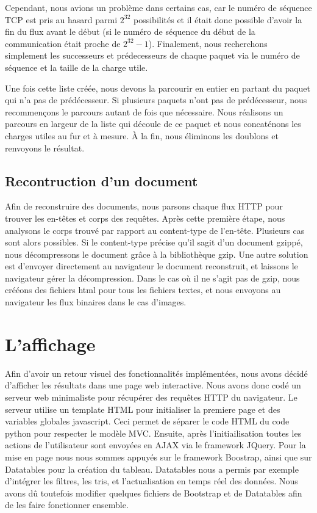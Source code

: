 Cependant, nous avions un problème dans certains cas, car le numéro de séquence TCP est pris au hasard parmi $2^{32}$ possibilités et il était donc possible d'avoir la fin du flux 
avant le début (si le numéro de séquence du début de la communication était proche de $2^{32} -1$). Finalement, nous recherchons simplement les successeurs et prédecesseurs de chaque
paquet via le numéro de séquence et la taille de la charge utile.

Une fois cette liste créée, nous devons la parcourir en entier en partant du paquet qui n'a pas de prédécesseur. Si plusieurs paquets n'ont pas de prédécesseur, nous recommençons le parcours autant de fois que nécessaire. Nous réalisons un parcours en largeur de la liste qui découle de ce paquet et nous concaténons les charges utiles au fur et à mesure. À la fin, nous éliminons les doublons et renvoyons le résultat.


\subsection{Recontruction d'un document}

Afin de reconstruire des documents, nous parsons chaque flux HTTP pour trouver les en-têtes et corps des requêtes. Après cette première étape, nous analysons le corps trouvé par rapport au content-type de l'en-tête.
Plusieurs cas sont alors possibles. Si le content-type précise qu'il sagit d'un document gzippé, nous décompressons le document grâce à la bibliothèque gzip. Une autre solution est d'envoyer directement au navigateur le document reconstruit, et laissons le navigateur gérer la décompression.
Dans le cas où il ne s'agit pas de gzip, nous crééons des fichiers html pour tous les fichiers textes, et nous envoyons au navigateur les flux binaires dans le cas d'images.



\section{L'affichage}
Afin d'avoir un retour visuel des fonctionnalités implémentées, nous avons décidé d'afficher les résultats dans une page web interactive. 
Nous avons donc codé un serveur web minimaliste pour récupérer des requêtes HTTP du navigateur. Le serveur utilise un template HTML pour
initialiser la premiere page et des variables globales javascript. Ceci permet de séparer le code HTML du code python pour respecter le modèle MVC.
Ensuite, après l'initiailisation toutes les actions de l'utilisateur sont envoyées en AJAX via le framework JQuery.
Pour la mise en page nous nous sommes appuyés sur le framework Boostrap, ainsi que sur Datatables pour la création du tableau. Datatables nous a
permis par exemple d'intégrer les filtres, les tris, et l'actualisation en temps réel des données. 
Nous avons dû toutefois modifier quelques fichiers de Bootstrap et de Datatables afin de les faire fonctionner ensemble.

